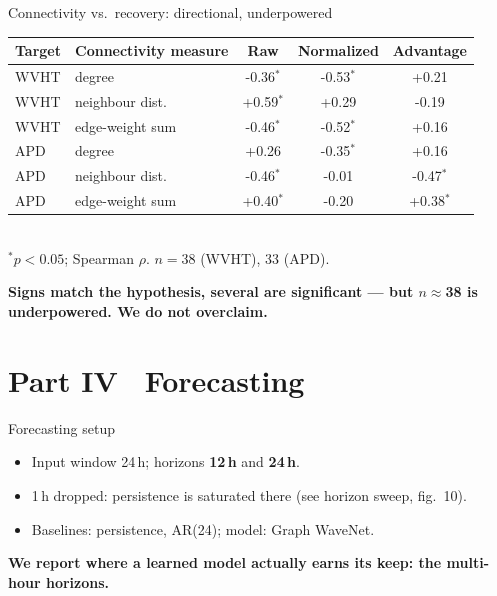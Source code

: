 \documentclass[aspectratio=169]{beamer}
\newcommand{\take}[1]{\vspace{0.6ex}\begin{center}\textbf{\color{colgraph}#1}\end{center}}
\begin{document}
\begin{frame}{Connectivity vs.\ recovery: directional, underpowered}
  \begin{center}\footnotesize
  \begin{tabular}{l l ccc}
    \toprule
    Target & Connectivity measure & Raw & Normalized & Advantage\\
    \midrule
WVHT & degree & -0.36$^{*}$ & -0.53$^{*}$ & +0.21 \\
WVHT & neighbour dist. & +0.59$^{*}$ & +0.29 & -0.19 \\
WVHT & edge-weight sum & -0.46$^{*}$ & -0.52$^{*}$ & +0.16 \\
APD & degree & +0.26 & -0.35$^{*}$ & +0.16 \\
APD & neighbour dist. & -0.46$^{*}$ & -0.01 & -0.47$^{*}$ \\
APD & edge-weight sum & +0.40$^{*}$ & -0.20 & +0.38$^{*}$ \\
    \bottomrule
  \end{tabular}\\[0.5ex]
  {\scriptsize $^{*}p<0.05$; Spearman $\rho$. $n=$38 (WVHT), 33 (APD).}
  \end{center}
  \take{Signs match the hypothesis, several are significant --- but $n\approx$38 is underpowered. We do not overclaim.}
\end{frame}

\section{Part IV \textperiodcentered\ Forecasting}

\begin{frame}{Forecasting setup}
  \begin{itemize}
    \item Input window 24\,h; horizons \textbf{12\,h} and \textbf{24\,h}.
    \item 1\,h dropped: persistence is saturated there (see horizon sweep, fig.\ 10).
    \item Baselines: \textcolor{coltemporal}{persistence}, \textcolor{coltemporal}{AR(24)}; model: \textcolor{colgraph}{Graph WaveNet}.
  \end{itemize}
  \take{We report where a learned model actually earns its keep: the multi-hour horizons.}
\end{frame}
\end{document}
